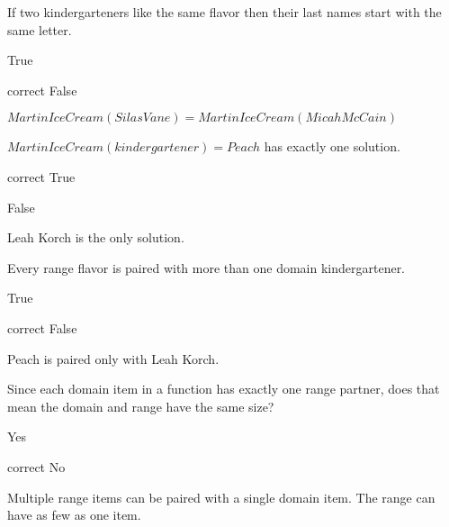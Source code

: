 \documentclass{ximera}
\begin{document}
\begin{question}
If two kindergarteners like the same flavor then their last names start with the same letter.
\begin{multipleChoice}
\item{True}
\item[correct]{False}
\end{multipleChoice}
\begin{feedback}
$MartinIceCream(Silas Vane) = MartinIceCream(Micah McCain)$
\end{feedback}
\end{question}


\begin{question}
$MartinIceCream(kindergartener) = Peach$ has exactly one solution.
\begin{multipleChoice}
\item[correct]{True}
\item{False}
\end{multipleChoice}
\begin{feedback}
Leah Korch is the only solution.
\end{feedback}
\end{question}


\begin{question}
Every range flavor is paired with more than one domain kindergartener.
\begin{multipleChoice}
\item{True}
\item[correct]{False}
\end{multipleChoice}
\begin{feedback}
Peach is paired only with Leah Korch.
\end{feedback}
\end{question}



\begin{question}
Since each domain item in a function has exactly one range partner, does that mean the domain and range have the same size?
\begin{multipleChoice}
\item{Yes}
\item[correct]{No}
\end{multipleChoice}
\begin{feedback}
Multiple range items can be paired with a single domain item.  The range can have as few as one item.
\end{feedback}
\end{question}
\end{document}
